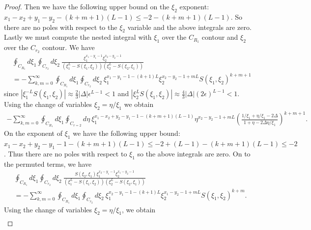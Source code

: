 \documentclass[10pt,a4paper]{amsart}
\begin{document}
\begin{proof}
 Then we have the following upper bound on the $\xi_2$ exponent: $x_1-x_2+y_1-y_2-(k+m+1)(L-1)\leq -2-(k+m+1)(L-1)$. So there are no poles with respect to the $\xi_2$ variable and the above integrals are zero. Lastly we must compute the nested integral with $\xi_1$ over the $C_{R_1}$ contour and $\xi_2$ over the $C_{r_2}$ contour. We have 
 \begin{equation}
     \begin{split}
         &\oint_{C_{R_1}}d\xi_1\oint_{C_{r_2}}d\xi_2 \ \frac{\xi_1^{x_1-y_1-1}\xi_2^{x_2-y_2-1}}{\left( \xi_1^L-S(\xi_1,\xi_2) \right)\left( \xi_2^L-S(\xi_2,\xi_1) \right)} \\
         &= -\sum_{k,m=0}^{\infty}\oint_{C_{R_1}}d\xi_1\oint_{C_{r_2}}d\xi_2 \ \xi_1^{x_1-y_1-1-(k+1)L}\xi_2^{x_2-y_2-1+mL}S(\xi_1,\xi_2)^{k+m+1}
     \end{split}
 \end{equation}
 since $|\xi_1^{-L}S(\xi_1,\xi_2)|\approx \frac23|\Delta|\epsilon^{L-1}<1$ and $|\xi_2^LS(\xi_1,\xi_2)|\approx \frac43|\Delta| (2\epsilon)^{L-1}<1$. Using the change of variables $\xi_2=\eta/\xi_1$ we obtain 
 \begin{equation}
     \begin{split}
         -\sum_{k,m=0}^{\infty}\oint_{C_{R_1}}d\xi_1\oint_{C_{r=2}}d\eta \ \xi_1^{x_1-x_2+y_2-y_1-1-(k+m+1)(L-1)}\eta^{x_2-y_2-1+mL}\left(\frac{1/\xi_1+\eta/\xi_1-2\Delta}{1+\eta-2\Delta\eta/\xi_1}\right)^{k+m+1}.
     \end{split}
 \end{equation}
 On the exponent of $\xi_1$ we have the following upper bound: $x_1-x_2+y_2-y_1-1-(k+m+1)(L-1) \leq -2 +(L-1) -(k+m+1)(L-1)\leq -2$. Thus there are no poles with respect to $\xi_1$ so the above integrals are zero. On to the permuted terms, we have
 \begin{equation}
     \begin{split}
         &\oint_{C_{R_1}}d\xi_1\oint_{C_{r_2}}d\xi_2 \ \frac{S(\xi_2,\xi_1)\xi_1^{x_2-y_1-1}\xi_2^{x_1-y_2-1}}{\left( \xi_1^L-S(\xi_1,\xi_2) \right)\left( \xi_2^L-S(\xi_2,\xi_1) \right)} \\
         &= -\sum_{k,m=0}^{\infty}\oint_{C_{R_1}}d\xi_1\oint_{C_{r_2}}d\xi_2 \ \xi_1^{x_2-y_1-1-(k+1)L}\xi_2^{x_1-y_2-1+mL}S(\xi_1,\xi_2)^{k+m}.
     \end{split}
 \end{equation}
Using the change of variables $\xi_2=\eta/\xi_1$, we obtain
\begin{equation}
    \begin{split}

\end{split}
\end{equation}
\end{proof}
\end{document}
